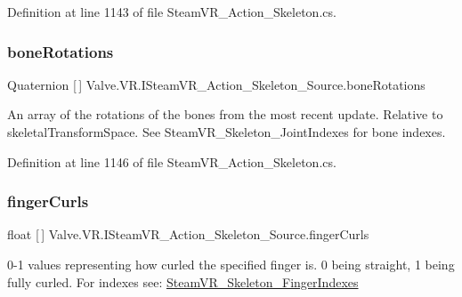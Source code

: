 Definition at line 1143 of file Steam\+V\+R\+\_\+\+Action\+\_\+\+Skeleton.\+cs.

\mbox{\label{interface_valve_1_1_v_r_1_1_i_steam_v_r___action___skeleton___source_a8319bb5669b0f4d0b2fd73aa665777dd}} 
\subsubsection{\texorpdfstring{boneRotations}{boneRotations}}
{\footnotesize\ttfamily Quaternion \mbox{[}$\,$\mbox{]} Valve.\+V\+R.\+I\+Steam\+V\+R\+\_\+\+Action\+\_\+\+Skeleton\+\_\+\+Source.\+bone\+Rotations\hspace{0.3cm}{\ttfamily [get]}}



An array of the rotations of the bones from the most recent update. Relative to skeletal\+Transform\+Space. See Steam\+V\+R\+\_\+\+Skeleton\+\_\+\+Joint\+Indexes for bone indexes. 



Definition at line 1146 of file Steam\+V\+R\+\_\+\+Action\+\_\+\+Skeleton.\+cs.

\mbox{\label{interface_valve_1_1_v_r_1_1_i_steam_v_r___action___skeleton___source_aa754453c9e7c84d5be21147f63efea3e}} 
\subsubsection{\texorpdfstring{fingerCurls}{fingerCurls}}
{\footnotesize\ttfamily float \mbox{[}$\,$\mbox{]} Valve.\+V\+R.\+I\+Steam\+V\+R\+\_\+\+Action\+\_\+\+Skeleton\+\_\+\+Source.\+finger\+Curls\hspace{0.3cm}{\ttfamily [get]}}



0-\/1 values representing how curled the specified finger is. 0 being straight, 1 being fully curled. For indexes see\+: \mbox{\hyperlink{class_valve_1_1_v_r_1_1_steam_v_r___skeleton___finger_indexes}{Steam\+V\+R\+\_\+\+Skeleton\+\_\+\+Finger\+Indexes}} 



